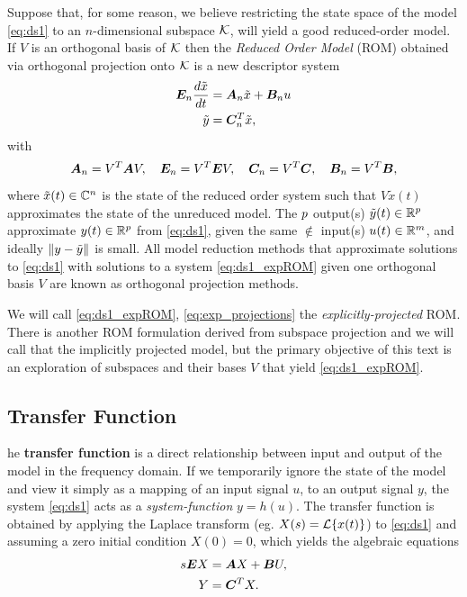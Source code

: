Suppose that, for some reason, we believe restricting the state space of the model \eqref{eq:ds1} to an $n$-dimensional subspace $\mathcal{K}$, will yield a good reduced-order model.  If $V$ is an orthogonal basis of $\mathcal{K}$ then the  \emph{Reduced Order Model} (ROM) obtained via orthogonal projection onto $\mathcal{K}$ is a new descriptor system
         \begin{equation}
         \begin{aligned}
                \bm{E}_n\frac{d\tilde{x}}{dt} &= \bm{A}_n \tilde{x} + \bm{B}_n u\\
                \tilde{y} &= \bm{C}_n^T \tilde{x},
        \end{aligned}
        \label{eq:ds1_expROM}
        \end{equation}
with
\begin{equation}
	\bm{A}_n = V^T \bm{A} V, \quad \bm{E}_n = V^T \bm{E} V, \quad \bm{C}_n = V^T \bm{C}, \quad \bm{B}_n = V^T \bm{B},
       \label{eq:exp_projections}
\end{equation}
where $\tilde{x}(t)\in\mathbb{C}^n$ is the state of the reduced order system such that $V\tilde{x}(t)$ approximates the state of the unreduced model.  The $p$ output(s) $\tilde{y}(t)\in\mathbb{R}^p$ approximate $y(t)\in\mathbb{R}^p$ from \eqref{eq:ds1}, given the same $\nin$ input(s) $u(t)\in\mathbb{R}^m$, and ideally $\left\| y-\tilde{y} \right\|_{}$ is small.   All model reduction methods that approximate solutions to \eqref{eq:ds1} with solutions to a system \eqref{eq:ds1_expROM} given one orthogonal basis $V$ are known as orthogonal projection methods.  
\bigskip

We will call  \eqref{eq:ds1_expROM}, \eqref{eq:exp_projections} the  \emph{explicitly-projected} ROM.  There is another ROM formulation derived from subspace projection and we will call that the implicitly projected model, but the primary objective of this text is an exploration of subspaces and their bases $V$ that yield \eqref{eq:ds1_expROM}. 
  
\clearpage
        \subsection{Transfer Function}\label{sec:tfunc_formulations}
       he  \textbf{transfer function}  is a direct 
        relationship between input and output of the model in the frequency domain.  If we temporarily ignore the state of the model and view it simply as a mapping of an input signal $u$, to an output signal $y$, the system \eqref{eq:ds1} acts as a \emph{system-function} $y=h(u)$.  The transfer function is obtained by applying the Laplace transform (eg. $X(s)=\mathcal{L}\{x(t)\}$) to  
        \eqref{eq:ds1} and assuming a zero initial condition $X(0)=0$, which 
        yields the algebraic equations 
         \begin{equation*}
                         \begin{aligned}
                                s\bm{E} X &=  \bm{A} X + \bm{B} U,\\
                                Y &= \bm{C}^TX.
                        \end{aligned}
        \end{equation*}

